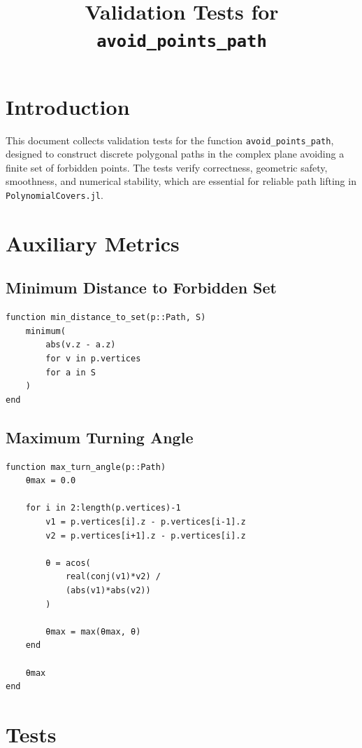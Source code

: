 \documentclass[11pt]{article}
\title{Validation Tests for \texttt{avoid_points_path}}
\author{}
\date{}
\begin{document}
\maketitle

\section{Introduction}

This document collects validation tests for the function
\texttt{avoid_points_path}, designed to construct discrete polygonal
paths in the complex plane avoiding a finite set of forbidden points.
The tests verify correctness, geometric safety, smoothness, and numerical
stability, which are essential for reliable path lifting in
\texttt{PolynomialCovers.jl}.

\section{Auxiliary Metrics}

\subsection{Minimum Distance to Forbidden Set}

\begin{lstlisting}
function min_distance_to_set(p::Path, S)
    minimum(
        abs(v.z - a.z)
        for v in p.vertices
        for a in S
    )
end
\end{lstlisting}

\subsection{Maximum Turning Angle}

\begin{lstlisting}
function max_turn_angle(p::Path)
    θmax = 0.0

    for i in 2:length(p.vertices)-1
        v1 = p.vertices[i].z - p.vertices[i-1].z
        v2 = p.vertices[i+1].z - p.vertices[i].z

        θ = acos(
            real(conj(v1)*v2) /
            (abs(v1)*abs(v2))
        )

        θmax = max(θmax, θ)
    end

    θmax
end
\end{lstlisting}

\section{Tests}
\end{document}
